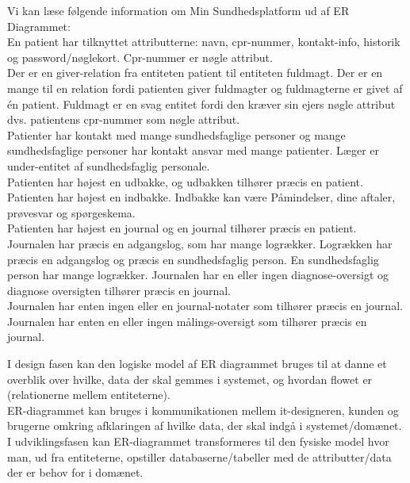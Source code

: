 Vi kan læse følgende information om Min Sundhedsplatform ud af ER Diagrammet:\\
En patient har tilknyttet attributterne: navn, cpr-nummer, kontakt-info, historik og password/nøglekort. Cpr-nummer er nøgle attribut.\\
Der er en giver-relation fra entiteten patient til entiteten fuldmagt. Der er en mange til en relation fordi patienten giver fuldmagter og fuldmagterne er givet af én patient. Fuldmagt er en svag entitet fordi den kræver sin ejers nøgle attribut dvs. patientens cpr-nummer som nøgle attribut. \\
Patienter har kontakt med mange sundhedsfaglige personer og mange  sundhedsfaglige personer har kontakt ansvar med mange patienter. Læger er under-entitet af sundhedsfaglig personale. \\
Patienten har højest en udbakke, og udbakken tilhører præcis en patient.\\
Patienten har højest en indbakke. Indbakke kan være Påmindelser, dine aftaler, prøvesvar og spørgeskema.\\
Patienten har højest en journal og en journal tilhører præcis en patient. \\
Journalen har præcis en adgangslog, som har mange logrækker. Logrækken har præcis en adgangslog og præcis en sundhedsfaglig person. En sundhedsfaglig person har mange logrækker.
Journalen har en eller ingen diagnose-oversigt og diagnose oversigten tilhører præcis en journal.\\
Journalen har enten ingen eller en journal-notater som tilhører præcis en journal.\\
Journalen har enten en eller ingen målings-oversigt som tilhører præcis en journal.

I design fasen kan den logiske model af ER diagrammet bruges til at danne et overblik over hvilke, data der skal gemmes i systemet, og hvordan flowet er (relationerne mellem entiteterne).\\
ER-diagrammet kan bruges i kommunikationen mellem it-designeren, kunden og brugerne omkring afklaringen af hvilke data, der skal indgå i systemet/domænet. \\
I udviklingsfasen kan ER-diagrammet transformeres til den fysiske model hvor man, ud fra entiteterne, opstiller databaserne/tabeller med de attributter/data der er behov for i domænet.